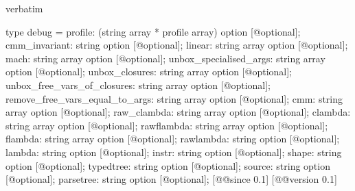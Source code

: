 \begin{camlexample}{verbatim}
\begin{caml}
\begin{camlinput}
type debug = {
  profile: (string array * profile array) option [@optional];
  cmm_invariant: string option [@optional];
  linear: string array option [@optional];
  mach: string array option [@optional];
  unbox_specialised_args: string array option [@optional];
  unbox_closures: string array option [@optional];
  unbox_free_vars_of_closures: string array option [@optional];
  remove_free_vars_equal_to_args: string array option [@optional];
  cmm: string array option [@optional];
  raw_clambda: string array option [@optional];
  clambda: string array option [@optional];
  rawflambda: string array option [@optional];
  flambda: string array option [@optional];
  rawlambda: string option [@optional];
  lambda: string option [@optional];
  instr: string option [@optional];
  shape: string option [@optional];
  typedtree: string option [@optional];
  source: string option [@optional];
  parsetree: string option [@optional];
} [@@since 0.1]
[@@version 0.1]
\end{camlinput}
\end{caml}
\end{camlexample}
